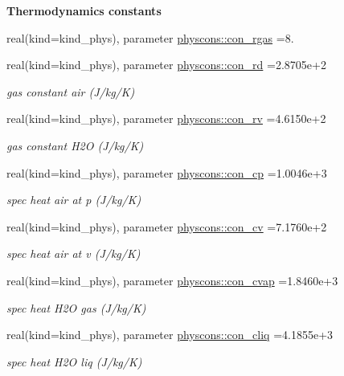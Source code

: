 \begin{Indent}{\bf Thermodynamics constants}\par
\begin{DoxyCompactItemize}
\item 
real(kind=kind\+\_\+phys), parameter \hyperlink{namespacephyscons_ab693404d71b608617bcb6efe24cb57c6}{physcons\+::con\+\_\+rgas} =8.
\item 
real(kind=kind\+\_\+phys), parameter \hyperlink{namespacephyscons_ac7dc37b0005878c5fd2f200720ffb059}{physcons\+::con\+\_\+rd} =2.\+8705e+2
\begin{DoxyCompactList}\small\item\em gas constant air (J/kg/K) \end{DoxyCompactList}\item 
real(kind=kind\+\_\+phys), parameter \hyperlink{namespacephyscons_a3ae962da4c7a9cb83c4a2abe743696b0}{physcons\+::con\+\_\+rv} =4.\+6150e+2
\begin{DoxyCompactList}\small\item\em gas constant H2O (J/kg/K) \end{DoxyCompactList}\item 
real(kind=kind\+\_\+phys), parameter \hyperlink{namespacephyscons_a29704d9a27091d61724e1a0c654d0f10}{physcons\+::con\+\_\+cp} =1.\+0046e+3
\begin{DoxyCompactList}\small\item\em spec heat air at p (J/kg/K) \end{DoxyCompactList}\item 
real(kind=kind\+\_\+phys), parameter \hyperlink{namespacephyscons_aff20707d9ec92cc8a555f7a4e63cb1dd}{physcons\+::con\+\_\+cv} =7.\+1760e+2
\begin{DoxyCompactList}\small\item\em spec heat air at v (J/kg/K) \end{DoxyCompactList}\item 
real(kind=kind\+\_\+phys), parameter \hyperlink{namespacephyscons_a0fc6465a87263f2fd3576365c485f81e}{physcons\+::con\+\_\+cvap} =1.\+8460e+3
\begin{DoxyCompactList}\small\item\em spec heat H2O gas (J/kg/K) \end{DoxyCompactList}\item 
real(kind=kind\+\_\+phys), parameter \hyperlink{namespacephyscons_a63660b93c455c1f072ade649bf87cadc}{physcons\+::con\+\_\+cliq} =4.\+1855e+3
\begin{DoxyCompactList}\small\item\em spec heat H2O liq (J/kg/K) \end{DoxyCompactList}\item 

\end{DoxyCompactItemize}
\end{Indent}
